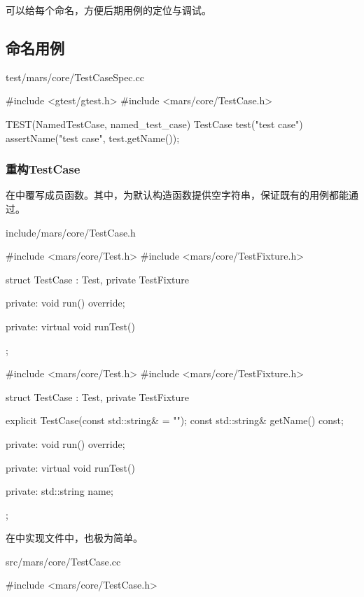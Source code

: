 \begin{content}

可以给每个命名，方便后期用例的定位与调试。

\subsection{命名用例}

\begin{nodiff}{test/mars/core/TestCaseSpec.cc}
 \begin{c++}
#include <gtest/gtest.h>
#include <mars/core/TestCase.h>

TEST(NamedTestCase, named_test_case) {
  TestCase test("test case")
  assertName("test case", test.getName());
}
 \end{c++}
\end{nodiff}

\subsubsection{重构TestCase}

在中覆写成员函数。其中，为默认构造函数提供空字符串，保证既有的用例都能通过。

\begin{diff}{include/mars/core/TestCase.h}
 \begin{minicpp}
#include <mars/core/Test.h>
#include <mars/core/TestFixture.h>

struct TestCase : Test, private TestFixture {
private:
  void run() override;

private:
  virtual void runTest() {}
};
 \end{minicpp}
\tcblower
 \begin{minicpp}
#include <mars/core/Test.h>
#include <mars/core/TestFixture.h>

struct TestCase : Test, private TestFixture {
  explicit TestCase(const std::string& = "");
  const std::string& getName() const;

private:
  void run() override;

private:
  virtual void runTest() {}

private:
  std::string name;
};
 \end{minicpp}
\end{diff}

在中实现文件中，也极为简单。

\begin{diff}{src/mars/core/TestCase.cc}
 \begin{minicpp}
#include <mars/core/TestCase.h>


\end{minicpp}
\end{diff}
\end{content}

